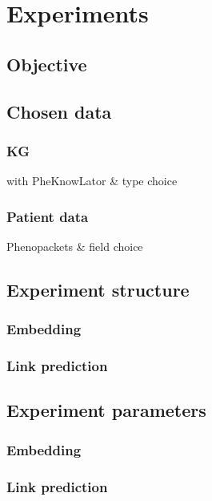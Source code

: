 \chapter{Experiments}

\section{Objective}


\section{Chosen data}
\subsection{KG} 
with PheKnowLator \& type choice
\subsection{Patient data}
Phenopackets \& field choice

\section{Experiment structure}
\subsection{Embedding}
\subsection{Link prediction}

\section{Experiment parameters}
\subsection{Embedding}
\subsection{Link prediction}
